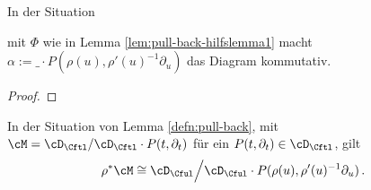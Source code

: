 %
\begin{lem} \label{lem:pull-back-hilfslemma2}
\def\myT{\cD_{\Cftl}}
\def\myU{\cD_{\Cful}}
In der Situation
\begin{center}
\end{center}
mit $\Phi$ wie in Lemma \ref{lem:pull-back-hilfslemma1}
macht $\alpha:=\_\!\cdot\! P(\rho(u),\rho'(u)^{-1}\partial_u)$ das Diagram
kommutativ.
\end{lem}
\begin{proof}
\end{proof}
%
\begin{lem} \label{lem:pull-back-hilfslemma3}
In der Situation von Lemma \ref{defn:pull-back}, mit
$\cM=\cD_{\Cftl}/\cD_{\Cftl}\cdot P(t,\partial_t)$ für ein
$P(t,\partial_t)\in\cD_{\Cftl}$, gilt
\[\rho^*\cM\cong \cD_{\Cful}\Big/\cD_{\Cful}\cdot
  P(\rho(u),\rho'(u)^{-1}\partial_u) \,. \]
\begin{comment}
also wird der Übergang beschrieben durch
\begin{align*}
t          &\rightarrow \rho(t) \\
\partial_t &\rightarrow \rho'(t)^{-1}\partial_u 
\end{align*}
\end{comment}
\end{lem}
